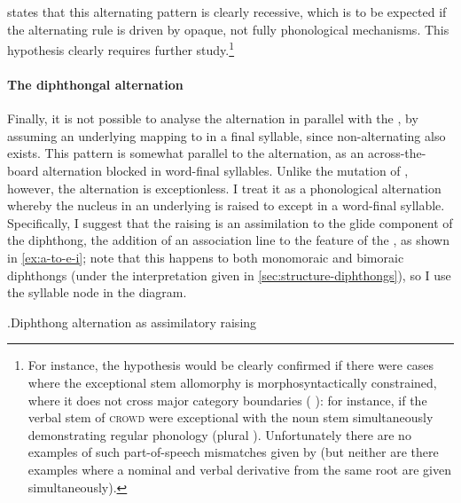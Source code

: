 \citet{awbery86:_pembr_welsh} states that this alternating pattern is clearly recessive, which is to be expected if the alternating rule is driven by opaque, not fully phonological mechanisms. This hypothesis clearly requires further study.\footnote{For instance, the hypothesis would be clearly confirmed if there were cases where the exceptional stem allomorphy is morphosyntactically constrained, \ie where it does not cross major category boundaries (\cf \citeauthor{bermúdez-oterong:_spanis} \cite*{bermúdez-oterong:_spanis}): for instance, if the verbal stem of \textsc{crowd} were exceptional  with the noun stem simultaneously demonstrating regular phonology (\eg plural \ipa{[ˈture]}). Unfortunately there are no examples of such part\hyp of\hyp speech mismatches given by \citet{awbery86:_pembr_welsh} (but neither are there examples where a nominal and verbal derivative from the same root are given simultaneously).}

\paragraph{The diphthongal alternation}
\label{sec:diphth-altern}

Finally, it is not possible to analyse the alternation \alternation{[ei]}{[ai]} in parallel with the \alternation{[i]}{[ə]}, by assuming an underlying  mapping to \ipa{[ai]} in a final syllable, since non-alternating \ipa{[ei]} also exists. This pattern is somewhat parallel to the \alternation{[u]}{[ə]} alternation, as an across\hyp the\hyp board alternation blocked in word-final syllables. Unlike the mutation of \ipa{[u]}, however, the \alternation{[ei]}{[ai]} alternation is exceptionless. I treat it as a phonological alternation whereby the nucleus in an underlying \ipa{[ai]} is raised to \ipa{[e]} except in a word-final syllable. Specifically, I suggest that the raising is an assimilation to the glide component of the diphthong, \ie the addition of an association line to the  feature of the \ipa{[i]}, as shown in \ref{ex:a-to-e-i}; note that this happens to both monomoraic and bimoraic diphthongs (under the interpretation given in \cref{sec:structure-diphthongs}), so I use the syllable node in the diagram.

\ex.\label{ex:a-to-e-i}Diphthong alternation as assimilatory raising\\

